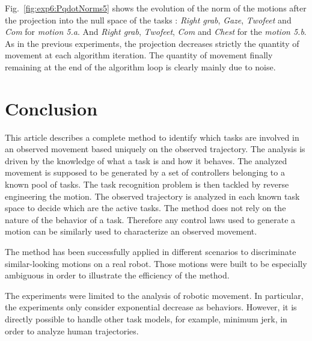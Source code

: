 \documentclass[journal]{IEEEtran}
\begin{document}
Fig.~\ref{fig:exp6:PqdotNorms5} shows the evolution of the norm of the motions after the projection
into the null space of the tasks : \emph{Right grab},  \emph{Gaze}, \emph{Twofeet} and \emph{Com} for
\emph{motion 5.a}. And \emph{Right grab}, \emph{Twofeet}, \emph{Com} and \emph{Chest} for the
\emph{motion 5.b}.
As in the previous experiments, the projection decreases strictly the quantity of movement
at each algorithm iteration. The quantity of movement finally remaining at the end of
the algorithm loop is clearly mainly due to noise.

\section{Conclusion}
This article describes a complete method to identify which tasks are involved in an observed movement
based uniquely on the observed trajectory.
The analysis is driven by the knowledge
of what a task is and how it behaves.
The analyzed movement is supposed to be generated by a set of
controllers belonging to a known pool of tasks.
The task recognition problem is then tackled by reverse engineering the motion.
The observed trajectory is analyzed
in each known task space to decide which are the active tasks.
The method does not rely on the nature of the behavior of a task. Therefore
any control laws used to generate a motion can be similarly
used to characterize an observed movement.

The method has been successfully applied in different
scenarios to discriminate similar-looking motions on a real robot. Those motions were built to be especially
ambiguous in order to illustrate the efficiency of the method.

The experiments were limited to the analysis of robotic movement. In particular,
the experiments only consider exponential decrease as behaviors.
However, it is directly possible to handle other task models, for example, minimum jerk,
in order to analyze human trajectories.


\end{document}
